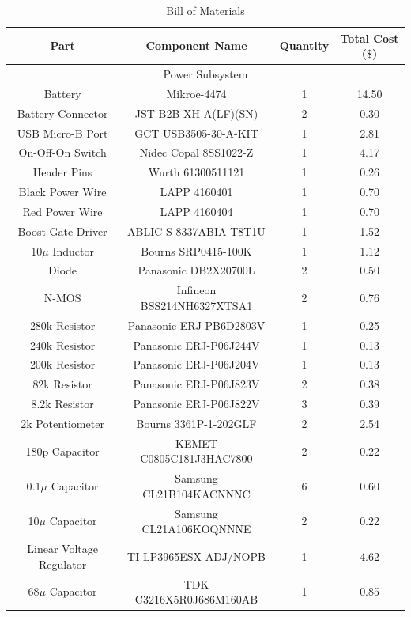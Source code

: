 \documentclass[12pt]{article}
\begin{document}
\begin{table}[!h]
	\caption{Bill of Materials}
	\label{tab:block_comps}
	\centering
	{\small
	\begin{tabular}{ |c|c|c|c| } 
 		\hline
 		\textbf{Part} & \textbf{Component Name} & \textbf{Quantity} & \textbf{Total Cost} ($\$$) \\
 		\hline
 		\hline
 		\multicolumn{4}{|c|}{Power Subsystem} \\
 		\hline
 		Battery & Mikroe-4474 & 1 & 14.50 \\
 		Battery Connector & JST B2B-XH-A(LF)(SN) & 2 & 0.30 \\
 		USB Micro-B Port & GCT USB3505-30-A-KIT & 1 & 2.81 \\
 		On-Off-On Switch & Nidec Copal 8SS1022-Z & 1 & 4.17 \\
 		Header Pins & Wurth 61300511121 & 1 & 0.26 \\
 		Black Power Wire & LAPP 4160401 & 1 & 0.70 \\
 		Red Power Wire & LAPP 4160404 & 1 & 0.70 \\
 		Boost Gate Driver & ABLIC S-8337ABIA-T8T1U & 1 & 1.52 \\
 		10$\mu$ Inductor & Bourns SRP0415-100K & 1 & 1.12 \\
 		Diode & Panasonic DB2X20700L & 2 & 0.50 \\
 		N-MOS & Infineon BSS214NH6327XTSA1 & 2 & 0.76 \\
 		280k Resistor & Panasonic ERJ-PB6D2803V & 1 & 0.25 \\
 		240k Resistor & Panasonic ERJ-P06J244V & 1 & 0.13 \\
 		200k Resistor & Panasonic ERJ-P06J204V & 1 & 0.13 \\
 		82k Resistor & Panasonic ERJ-P06J823V & 2 & 0.38 \\
 		8.2k Resistor & Panasonic ERJ-P06J822V & 3 & 0.39 \\
 		2k Potentiometer & Bourns 3361P-1-202GLF & 2 & 2.54 \\
 		180p Capacitor & KEMET C0805C181J3HAC7800 & 2 & 0.22 \\
 		0.1$\mu$ Capacitor & Samsung CL21B104KACNNNC & 6 & 0.60 \\
 		10$\mu$ Capacitor & Samsung CL21A106KOQNNNE & 2 & 0.22 \\
 		Linear Voltage Regulator & TI LP3965ESX-ADJ/NOPB & 1 & 4.62 \\
 		68$\mu$ Capacitor & TDK C3216X5R0J686M160AB & 1 & 0.85 \\

\end{tabular}}
\end{table}
\end{document}
